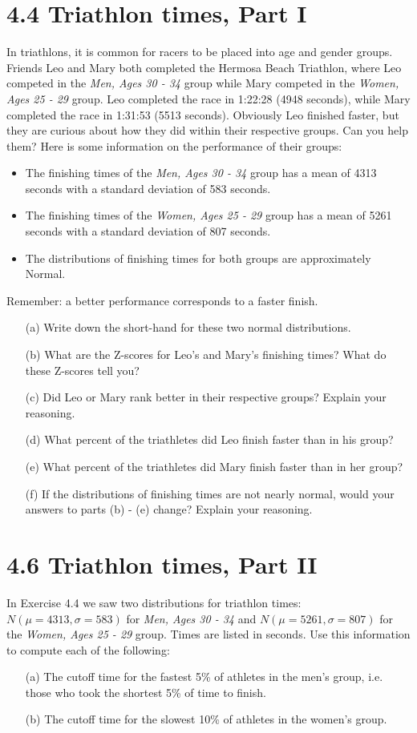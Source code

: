 \documentclass{article}
\begin{document}
\section*{4.4 Triathlon times, Part I}
In triathlons, it is common for racers to be placed into age and gender groups. Friends Leo and Mary both completed the Hermosa Beach Triathlon, where Leo competed in the \textit{Men, Ages 30 - 34} group while Mary competed in the \textit{Women, Ages 25 - 29} group. Leo completed the race in 1:22:28 (4948 seconds), while Mary completed the race in 1:31:53 (5513 seconds). Obviously Leo finished faster, but they are curious about how they did within their respective groups. Can you help them? Here is some information on the performance of their groups:
\begin{itemize}
    \item The finishing times of the \textit{Men, Ages 30 - 34} group has a mean of 4313 seconds with a standard deviation of 583 seconds.
    \item The finishing times of the \textit{Women, Ages 25 - 29} group has a mean of 5261 seconds with a standard deviation of 807 seconds.
    \item The distributions of finishing times for both groups are approximately Normal.
\end{itemize}
Remember: a better performance corresponds to a faster finish.
\begin{itemize}
    \item[(a)] Write down the short-hand for these two normal distributions.
    \item[(b)] What are the Z-scores for Leo’s and Mary’s finishing times? What do these Z-scores tell you?
    \item[(c)] Did Leo or Mary rank better in their respective groups? Explain your reasoning.
    \item[(d)] What percent of the triathletes did Leo finish faster than in his group?
    \item[(e)] What percent of the triathletes did Mary finish faster than in her group?
    \item[(f)] If the distributions of finishing times are not nearly normal, would your answers to parts (b) - (e) change? Explain your reasoning.
\end{itemize}


\section*{4.6 Triathlon times, Part II}
In Exercise 4.4 we saw two distributions for triathlon times: \( N(\mu = 4313, \sigma = 583) \) for \textit{Men, Ages 30 - 34} and \( N(\mu = 5261, \sigma = 807) \) for the \textit{Women, Ages 25 - 29} group. Times are listed in seconds. Use this information to compute each of the following:
\begin{itemize}
    \item[(a)] The cutoff time for the fastest 5\% of athletes in the men’s group, i.e. those who took the shortest 5\% of time to finish.
    \item[(b)] The cutoff time for the slowest 10\% of athletes in the women’s group.
\end{itemize}
\end{document}
